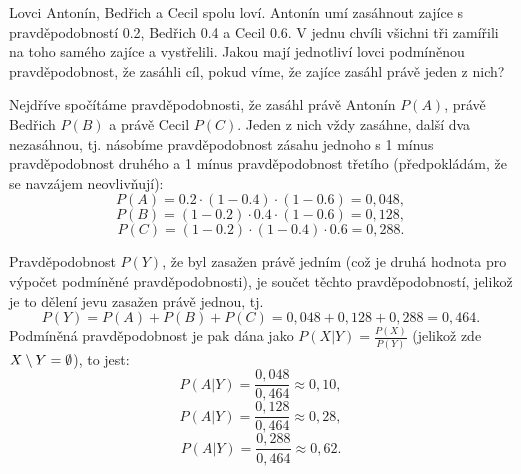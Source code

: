 \documentclass[12pt]{article}					%
\begin{document}
\begin{priklad}[1]
    Lovci Antonín, Bedřich a Cecil spolu loví. Antonín umí zasáhnout zajíce s pravděpodobností 0.2, Bedřich 0.4 a Cecil 0.6. V jednu chvíli všichni tři zamířili na toho samého zajíce a vystřelili. Jakou mají jednotliví lovci podmíněnou pravděpodobnost, že zasáhli cíl, pokud víme, že zajíce zasáhl právě jeden z nich?

    \begin{reseni}
        Nejdříve spočítáme pravděpodobnosti, že zasáhl právě Antonín $P(A)$, právě Bedřich $P(B)$ a právě Cecil $P(C)$. Jeden z nich vždy zasáhne, další dva nezasáhnou, tj. násobíme pravděpodobnost zásahu jednoho s 1 mínus pravděpodobnost druhého a 1 mínus pravděpodobnost třetího (předpokládám, že se navzájem neovlivňují):
        $$ P(A) = 0.2 · (1-0.4) · (1-0.6) = 0,048, $$
        $$ P(B) = (1 - 0.2) · 0.4 · (1-0.6) = 0,128, $$
        $$ P(C) = (1-0.2) · (1-0.4) · 0.6 = 0,288. $$

        Pravděpodobnost $P(Y)$, že byl zasažen právě jedním (což je druhá hodnota pro výpočet podmíněné pravděpodobnosti), je součet těchto pravděpodobností, jelikož je to dělení jevu zasažen právě jednou, tj.
        $$ P(Y) = P(A) + P(B) + P(C) = 0,048 + 0,128 + 0,288 = 0,464. $$
        Podmíněná pravděpodobnost je pak dána jako $P(X|Y) = \frac{P(X)}{P(Y)}$ (jelikož zde $X \setminus Y = \emptyset$), to jest:
        $$ P(A|Y) = \frac{0,048}{0,464} \approx 0,10, $$ 
        $$ P(A|Y) = \frac{0,128}{0,464} \approx 0,28, $$ 
        $$ P(A|Y) = \frac{0,288}{0,464} \approx 0,62. $$ 
    \end{reseni}
\end{priklad}
\end{document}
